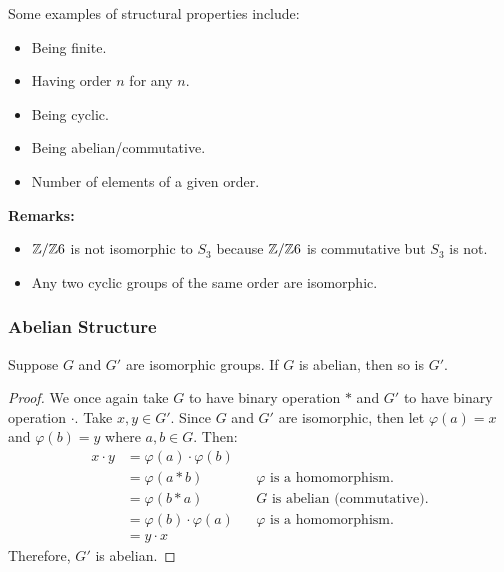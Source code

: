 \documentclass[letterpaper]{article}
\begin{document}
\bigskip 

Some examples of structural properties include: 
\begin{itemize}
    \item Being finite. 
    \item Having order $n$ for any $n$. 
    \item Being cyclic. 
    \item Being abelian/commutative. 
    \item Number of elements of a given order. 
\end{itemize}

\textbf{Remarks:}
\begin{itemize}
    \item $\mathbb{Z} / \mathbb{Z} 6$ is not isomorphic to $S_3$ because $\mathbb{Z} / \mathbb{Z} 6$ is commutative but $S_3$ is not. 
    \item Any two cyclic groups of the same order are isomorphic. 
\end{itemize} 

\subsubsection{Abelian Structure}
\begin{mdframed}
    \begin{proposition}
        Suppose $G$ and $G'$ are isomorphic groups. If $G$ is abelian, then so is $G'$. 
    \end{proposition}
\end{mdframed}

\begin{mdframed}
    \begin{proof}
        We once again take $G$ to have binary operation $*$ and $G'$ to have binary operation $\cdot$. Take $x, y \in G'$. Since $G$ and $G'$ are isomorphic, then let $\varphi(a) = x$ and $\varphi(b) = y$ where $a, b \in G$. Then: 
        \begin{equation*}
            \begin{aligned}
                x \cdot y &= \varphi(a) \cdot \varphi(b) \\ 
                    &= \varphi(a * b) && \varphi \text{ is a homomorphism.} \\ 
                    &= \varphi(b * a) && G \text{ is abelian (commutative).} \\ 
                    &= \varphi(b) \cdot \varphi(a) && \varphi \text{ is a homomorphism.} \\ 
                    &= y \cdot x
            \end{aligned}
        \end{equation*}  
        Therefore, $G'$ is abelian. 
    \end{proof}
\end{mdframed}
\end{document}
